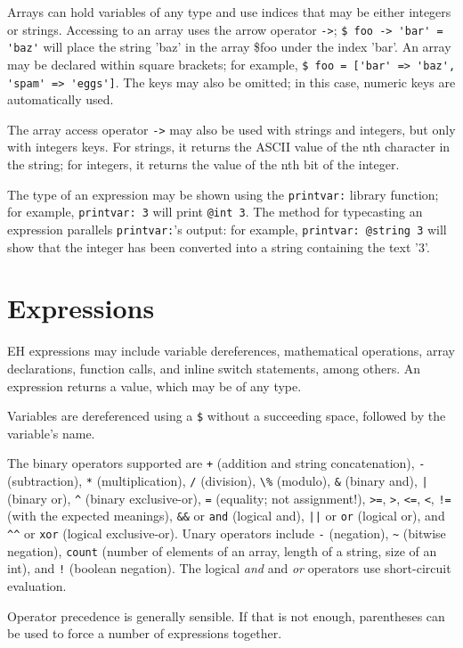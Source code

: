 \documentclass{article}
\begin{document}
Arrays can hold variables of any type and use indices that may be either integers or strings. Accessing to an array uses the arrow operator \verb#->#; \verb#$ foo -> 'bar' = 'baz'# will place the string 'baz' in the array \$foo under the index 'bar'. An array may be declared within square brackets; for example, \verb#$ foo = ['bar' => 'baz', 'spam' => 'eggs']#. The keys may also be omitted; in this case, numeric keys are automatically used.

The array access operator \verb#-># may also be used with strings and integers, but only with integers keys. For strings, it returns the ASCII value of the nth character in the string; for integers, it returns the value of the nth bit of the integer.

The type of an expression may be shown using the \verb#printvar:# library function; for example, \verb#printvar: 3# will print \verb#@int 3#. The method for typecasting an expression parallels \verb#printvar:#'s output: for example, \verb#printvar: @string 3# will show that the integer has been converted into a string containing the text '3'.

\section{Expressions}
EH expressions may include variable dereferences, mathematical operations, array declarations, function calls, and inline switch statements, among others. An expression returns a value, which may be of any type.

Variables are dereferenced using a \verb#$# without a succeeding space, followed by the variable's name.

The binary operators supported are \verb#+# (addition and string concatenation), \verb#-# (subtraction), \verb#*# (multiplication), \verb#/# (division), \verb#\%# (modulo), \verb#&# (binary and), \verb#|# (binary or), \verb#^# (binary exclusive-or), \verb#=# (equality; not assignment!), \verb#>=#, \verb#>#, \verb#<=#, \verb#<#, \verb#!=# (with the expected meanings), \verb#&&# or \verb#and# (logical and), \verb#||# or \verb#or# (logical or), and \verb#^^# or \verb#xor# (logical exclusive-or). Unary operators include \verb#-# (negation), \verb#~# (bitwise negation), \verb#count# (number of elements of an array, length of a string, size of an int), and \verb#!# (boolean negation). The logical \textit{and} and \textit{or} operators use short-circuit evaluation.

Operator precedence is generally sensible. If that is not enough, parentheses can be used to force a number of expressions together.
\end{document}
